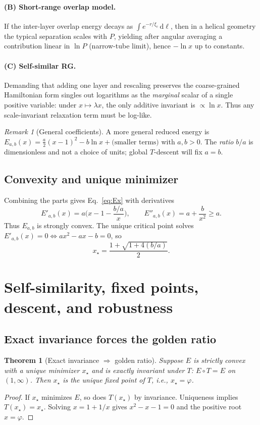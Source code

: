 \documentclass[11pt]{article}
\newtheorem{theorem}{Theorem}
\theoremstyle{remark}
\newtheorem{remark}{Remark}
\theoremstyle{definition}
\newcommand{\ph}{\varphi}
\begin{document}
\paragraph{(B) Short-range overlap model.} If the inter-layer overlap energy decays as $\int e^{-r/\xi_c}\,\mathrm d\ell$, then in a helical geometry the typical separation scales with $P$, yielding after angular averaging a contribution linear in $\ln P$ (narrow-tube limit), hence $-\ln x$ up to constants.

\paragraph{(C) Self-similar RG.} Demanding that adding one layer and rescaling preserves the coarse-grained Hamiltonian form singles out logarithms as the \emph{marginal} scalar of a single positive variable: under $x\mapsto \lambda x$, the only additive invariant is $\propto \ln x$. Thus any scale-invariant relaxation term must be log-like.

\begin{remark}[General coefficients]
A more general reduced energy is $E_{a,b}(x)=\tfrac{a}{2}(x-1)^2-b\ln x+\text{(smaller terms)}$ with $a,b>0$. The \emph{ratio} $b/a$ is dimensionless and not a choice of units; global $T$-descent will fix $a=b$.
\end{remark}

\subsection{Convexity and unique minimizer}
Combining the parts gives Eq.~\eqref{eq:Ex} with derivatives
\begin{equation}
 E'_{a,b}(x)=a\Big(x-1-\frac{b/a}{x}\Big),\qquad E''_{a,b}(x)=a+\frac{b}{x^2}\ge a.
\end{equation}
Thus $E_{a,b}$ is strongly convex. The unique critical point solves $E'_{a,b}(x)=0\iff ax^2-ax-b=0$, so
\begin{equation}
 x_\star=\frac{1+\sqrt{1+4(b/a)}}{2}.
\end{equation}

\section{Self-similarity, fixed points, descent, and robustness}
\subsection{Exact invariance forces the golden ratio}
\begin{theorem}[Exact invariance $\Rightarrow$ golden ratio]
Suppose $E$ is strictly convex with a unique minimizer $x_\star$ and is exactly invariant under $T$: $E\circ T=E$ on $(1,\infty)$. Then $x_\star$ is the unique fixed point of $T$, i.e., $x_\star=\ph$.
\end{theorem}
\begin{proof}
If $x_\star$ minimizes $E$, so does $T(x_\star)$ by invariance. Uniqueness implies $T(x_\star)=x_\star$. Solving $x=1+1/x$ gives $x^2-x-1=0$ and the positive root $x=\ph$.
\end{proof}
\end{document}
